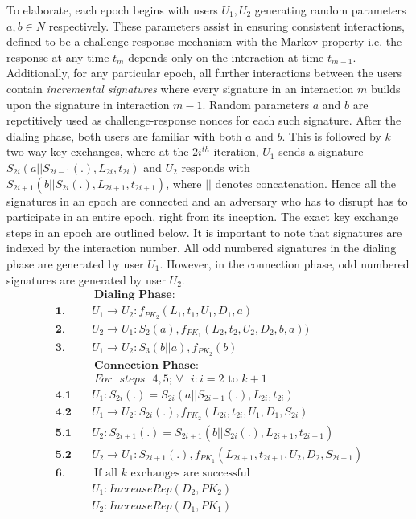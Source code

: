 \documentclass[letterpaper,twocolumn]{sig-alternate}
\begin{document}
To elaborate, each epoch begins with users $U_1,U_2$ generating random parameters $a,b \in N$ respectively. These parameters assist in ensuring consistent interactions, defined to be a challenge-response mechanism with the Markov property i.e. the response at any time
$t_{m}$ depends only on the interaction at time $t_{m-1}$. Additionally, for any particular epoch, all further interactions between the users contain {\em incremental signatures} where every signature in an interaction $m$ builds upon the signature in interaction $m-1$. Random parameters $a$ and $b$ are repetitively used as challenge-response nonces for each such signature. After the dialing phase, both users are familiar with both $a$ and $b$. This is followed by $k$ two-way key exchanges, where at the $2i^{th}$ iteration, $U_1$ sends a signature $S_{2i}(a||S_{2i-1}(.), L_{2i},t_{2i})$ and $U_2$ responds with $S_{2i+1}(b||S_{2i}(.), L_{2i+1},t_{2i+1})$, where $||$ denotes concatenation. 
Hence all the signatures in an epoch are connected and an adversary who has to disrupt has to participate in an entire epoch, right from its inception. The exact key exchange steps in an epoch are outlined below. It is important to note that signatures are indexed by the interaction number. All odd numbered signatures in the dialing phase are generated by user $U_1$. However, in the connection phase, odd numbered signatures are generated by user $U_2$.
\vspace{-1mm}
\begin{align*}
\textbf{} & \quad ~\textbf{Dialing Phase:} \\
\textbf{1}.& \quad U_1 \rightarrow U_2: f_{PK_2}(L_{1},t_{1},U_1,D_1,a) \\
\textbf{2}.& \quad U_2 \rightarrow U_1: S_2(a),f_{PK_1}(L_2,t_2,U_2,D_2,b,a)) \\
\textbf{3}.& \quad U_1 \rightarrow U_2: S_3(b||a),f_{PK_2}(b) \\
\textbf{} & \quad ~\textbf{Connection Phase:} \\
\textbf{} & \quad ~\text{$For$ $steps$ $4,5$; $\forall$ $i: i = 2$ to $k+1$} \\
\textbf{4.1} & \quad U_1: S_{2i}(.)= S_{2i}(a||S_{2i-1}(.), L_{2i}, t_{2i}) \\
\textbf{4.2} & \quad U_1 \rightarrow U_2: S_{2i}(.),f_{PK_2}(L_{2i},t_{2i},U_1,D_1,S_{2i}) \\
\textbf{5.1} & \quad U_2: S_{2i+1}(.) =S_{2i+1}(b||S_{2i}(.), L_{2i+1}, t_{2i+1}) \\ 
\textbf{5.2} & \quad U_2 \rightarrow U_1: S_{2i+1}(.),f_{PK_1}(L_{2i+1},t_{2i+1},U_2,D_2,S_{2i+1})\\ 
\textbf{6}.& \quad ~\text{If all $k$ exchanges are successful} \\ 
\textbf{} & \quad U_1: IncreaseRep(D_2, PK_2)\\
\textbf{} & \quad U_2: IncreaseRep(D_1, PK_1)\\
\end{align*}
\vspace{-6mm}
\end{document}
